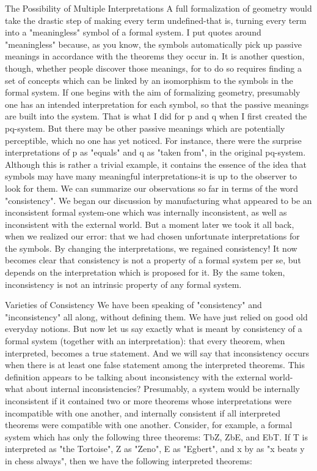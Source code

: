 The Possibility of Multiple Interpretations A full formalization of geometry would take the drastic step of making every term undefined-that is, turning every term into a "meaningless" symbol of a formal system. I put quotes around "meaningless" because, as you know, the symbols automatically pick up passive meanings in accordance with the theorems they occur in. It is another question, though, whether people discover those meanings, for to do so requires finding a set of concepts which can be linked by an isomorphism to the symbols in the formal system. If one begins with the aim of formalizing geometry, presumably one has an intended interpretation for each symbol, so that the passive meanings are built into the system. That is what I did for p and q when I first created the pq-system. But there may be other passive meanings which are potentially perceptible, which no one has yet noticed. For instance, there were the surprise interpretations of p as "equals" and q as "taken from", in the original pq-system. Although this is rather a trivial example, it contains the essence of the idea that symbols may have many meaningful interpretations-it is up to the observer to look for them. We can summarize our observations so far in terms of the word "consistency". We began our discussion by manufacturing what appeared to be an inconsistent formal system-one which was internally inconsistent, as well as inconsistent with the external world. But a moment later we took it all back, when we realized our error: that we had chosen unfortunate interpretations for the symbols. By changing the interpretations, we regained consistency! It now becomes clear that consistency is not a property of a formal system per se, but depends on the interpretation which is proposed for it. By the same token, inconsistency is not an intrinsic property of any formal system. 

Varieties of Consistency We have been speaking of "consistency" and "inconsistency" all along, without defining them. We have just relied on good old everyday notions. But now let us say exactly what is meant by consistency of a formal system (together with an interpretation): that every theorem, when interpreted, becomes a true statement. And we will say that inconsistency occurs when there is at least one false statement among the interpreted theorems. This definition appears to be talking about inconsistency with the external world- what about internal inconsistencies? Presumably, a system would be internally inconsistent if it contained two or more theorems whose interpretations were incompatible with one another, and internally consistent if all interpreted theorems were compatible with one another. Consider, for example, a formal system which has only the following three theorems: TbZ, ZbE, and EbT. If T is interpreted as "the Tortoise", Z as "Zeno", E as "Egbert", and x by as "x beats y in chess always", then we have the following interpreted theorems: 







